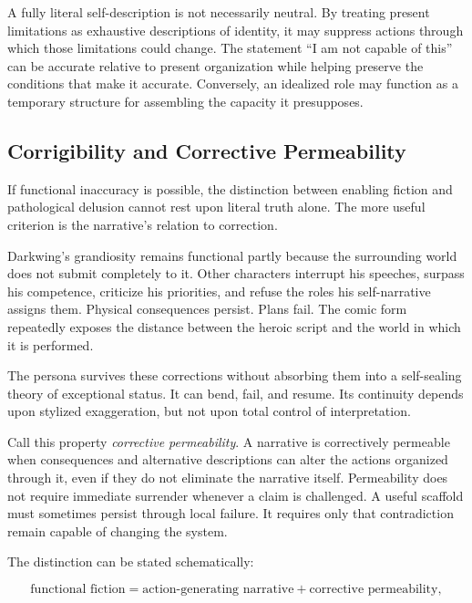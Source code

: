 \documentclass[11pt]{article}
\newcommand{\term}[1]{\emph{#1}}
\begin{document}
A fully literal self-description is not necessarily neutral. By treating
present limitations as exhaustive descriptions of identity, it may suppress
actions through which those limitations could change. The statement ``I am
not capable of this'' can be accurate relative to present organization while
helping preserve the conditions that make it accurate. Conversely, an
idealized role may function as a temporary structure for assembling the
capacity it presupposes.

\subsection{Corrigibility and Corrective Permeability}

If functional inaccuracy is possible, the distinction between enabling
fiction and pathological delusion cannot rest upon literal truth alone. The
more useful criterion is the narrative's relation to correction.

Darkwing's grandiosity remains functional partly because the surrounding world
does not submit completely to it. Other characters interrupt his speeches,
surpass his competence, criticize his priorities, and refuse the roles his
self-narrative assigns them. Physical consequences persist. Plans fail. The
comic form repeatedly exposes the distance between the heroic script and the
world in which it is performed.

The persona survives these corrections without absorbing them into a
self-sealing theory of exceptional status. It can bend, fail, and resume. Its
continuity depends upon stylized exaggeration, but not upon total control of
interpretation.

Call this property \term{corrective permeability}. A narrative is
correctively permeable when consequences and alternative descriptions can
alter the actions organized through it, even if they do not eliminate the
narrative itself. Permeability does not require immediate surrender whenever a
claim is challenged. A useful scaffold must sometimes persist through local
failure. It requires only that contradiction remain capable of changing the
system.

The distinction can be stated schematically:

\begin{equation}
  \text{functional fiction}
  =
  \text{action-generating narrative}
  +
  \text{corrective permeability},
  \label{eq:functional-fiction}
\end{equation}
\end{document}
